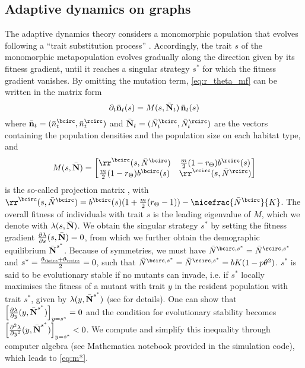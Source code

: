 \subsection{Adaptive dynamics on graphs}
The adaptive dynamics theory considers a monomorphic population that evolves following a “trait substitution process” \citep{Meszena1997}. Accordingly, the trait $s$ of the monomorphic metapopulation evolves gradually along the direction given by its fitness gradient, until it reaches a singular strategy $s^*$ for which the fitness gradient vanishes. By omitting the mutation term, \cref{eq:r_theta_mf} can be written in the matrix form
\begin{equation}
  \partial_t \bar{\textbf n}_t(s) = M(s, \bar{\textbf N}_t) \, \bar{\textbf n}_t(s)
\end{equation}
where $\bar{\textbf n}_t = (\bar{n}^{\bcirc}_t, \bar{n}^{\rcirc}_t)$ and
$\bar{\textbf N}_t = (\bar{N}^{\bcirc}_t, \bar{N}^{\rcirc}_t)$ are the vectors containing the population densities and the population size on each habitat type, and
\begin{equation}
M(s, \bar{\textbf N}) = 
\begin{bmatrix}
  \rr^{\bcirc}(s,\bar{N}^{\bcirc}) & \tfrac{m}{2} (1-r_\Theta)b^{\rcirc}(s) \\
  \tfrac{m}{2} (1-r_\Theta)b^{\bcirc}(s) & \rr^{\rcirc}(s,\bar{N}^{\rcirc})
\end{bmatrix}
\end{equation} 
is the so-called projection matrix \citep{Meszena1997}, with 
$\rr^{\bcirc}(s,\bar{N}^{\bcirc}) = b^{{\bcirc}}(s)(1+\tfrac{m}{2} (r_\Theta-1)) - \nicefrac{\bar{N}^{\bcirc}}{K}$. The overall fitness of individuals with trait $s$ is the leading eigenvalue of $M$, which we denote with $\lambda(s,\bar{\textbf N})$. We obtain the singular strategy $s^*$ by setting the fitness gradient $\frac{\partial \lambda}{\partial s} (s, \bar{\textbf N}) = 0$, from which we further obtain the demographic equilibrium $\bar{\textbf N}^{s^{*}}$. Because of symmetries, we must have $\bar{N}^{\bcirc,s^*} = \bar{N}^{\rcirc,s^*} $ and $s^* = \frac{\theta_{\bcirc} +\theta_{\rcirc}}{2} =0$, such that $\bar{N}^{\bcirc,s^*} = \bar{N}^{\rcirc,s^*} = bK(1 - p \theta^2)$. $s^*$ is said to be evolutionary stable if no mutants can invade, i.e. if $s^*$ locally maximises the fitness of a mutant with trait $y$ in the resident population with trait $s^*$, given by $\lambda(y, \bar{\textbf N}^{s^*})$ (see \citep{Meszena1997} for details). One can show that $\left[ \frac{\partial \lambda}{\partial y}(y, \bar{\textbf N}^{s^*}) \right]_{y = s^*} = 0$ and the condition for evolutionary stability becomes $ \left[ \frac{\partial^2 \lambda}{\partial y^2}(y, \bar{\textbf N}^{s^*}) \right]_{y = s^*} < 0 $. We compute and simplify this inequality through computer algebra (see Mathematica notebook provided in the simulation code), which leads to \cref{eq:m*}.


